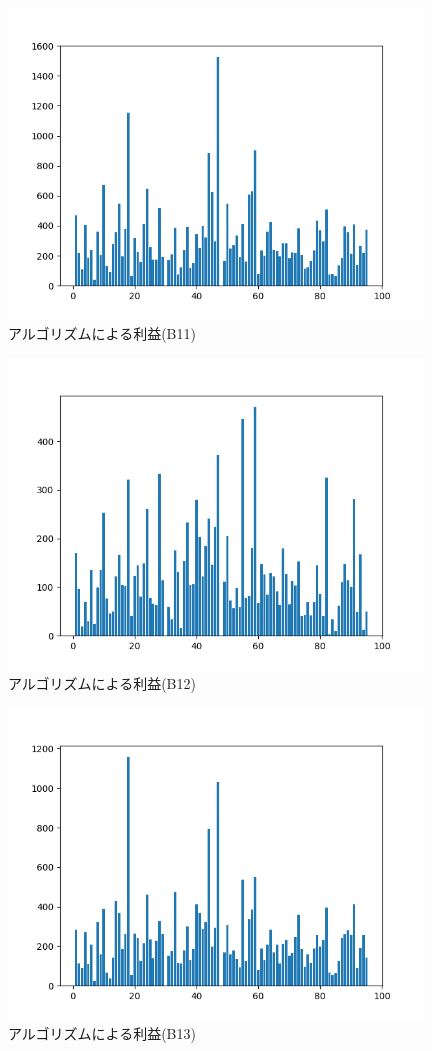  \begin{figure}[H]
  \centering
  \includegraphics[width=110mm]{fig/bbmacdon_saiteki.png}
  \caption{アルゴリズムによる利益(B11)}
  \label{fig:bbmacdonsai}
 \end{figure}

 \begin{figure}[H]
  \centering
  \includegraphics[width=110mm]{fig/bbmacdandfm_saiteki.png}
  \caption{アルゴリズムによる利益(B12)}
  \label{fig:bbmacdandfmsai}
 \end{figure}

 \begin{figure}[H]
  \centering
  \includegraphics[width=110mm]{fig/bbandfmmacd_saiteki.png}
  \caption{アルゴリズムによる利益(B13)}
  \label{fig:bbandfmmacdsai}
 \end{figure}


